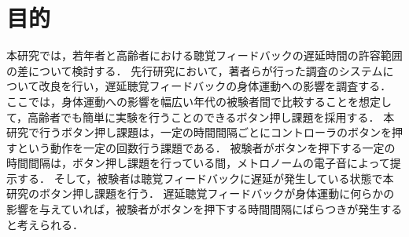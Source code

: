 \section{目的}
本研究では，若年者と高齢者における聴覚フィードバックの遅延時間の許容範囲の差について検討する．
先行研究\cite{shigematu}において，著者らが行った調査のシステムについて改良を行い，遅延聴覚フィードバックの身体運動への影響を調査する．
ここでは，身体運動への影響を幅広い年代の被験者間で比較することを想定して，高齢者でも簡単に実験を行うことのできるボタン押し課題を採用する．
本研究で行うボタン押し課題は，一定の時間間隔ごとにコントローラのボタンを押すという動作を一定の回数行う課題である．
被験者がボタンを押下する一定の時間間隔は，ボタン押し課題を行っている間，メトロノームの電子音によって提示する．
そして，被験者は聴覚フィードバックに遅延が発生している状態で本研究のボタン押し課題を行う．
遅延聴覚フィードバックが身体運動に何らかの影響を与えていれば，被験者がボタンを押下する時間間隔にばらつきが発生すると考えられる．
\newpage


